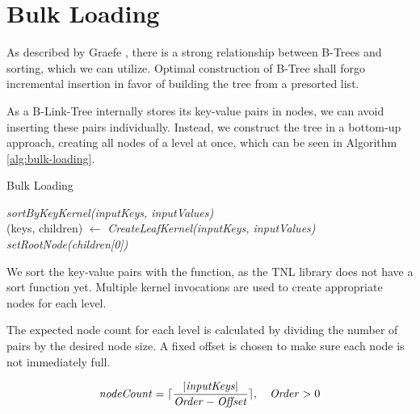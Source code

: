\section{Bulk Loading}

As described by Graefe \cite{goetz-tech}, there is a strong relationship between B-Trees and sorting, which we can utilize. Optimal construction of B-Tree shall forgo incremental insertion in favor of building the tree from a presorted list.

As a B-Link-Tree internally stores its key-value pairs in nodes, we can avoid inserting these pairs individually. Instead, we construct the tree in a bottom-up approach, creating all nodes of a level at once, which can be seen in Algorithm \ref{alg:bulk-loading}.

\begin{algorithm}[H]
  \caption{Bulk Loading}\label{alg:bulk-loading}

  \textit{sortByKeyKernel(inputKeys, inputValues)}\\
  (keys, children) $\gets$ \textit{CreateLeafKernel(inputKeys, inputValues)}\\
  \textit{setRootNode(children[0])}
\end{algorithm}

We sort the key-value pairs with the  function, as the TNL library does not have a sort function yet. Multiple kernel invocations are used to create appropriate nodes for each level.

The expected node count for each level is calculated by dividing the number of pairs by the desired node size. A fixed offset is chosen to make sure each node is not immediately full.

$$\mathit{nodeCount} = \lceil\frac{|\mathit{inputKeys}|}{\mathit{Order} - \mathit{Offset}}\rceil,\quad \begin{aligned} \mathit{Order} > 0\end{aligned}$$


